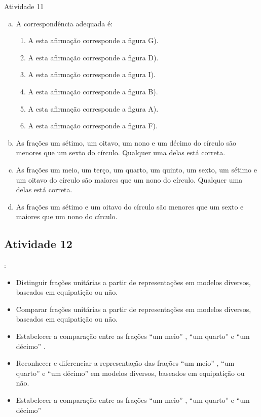 \begin{multicols}{2}
\begin{resposta*}{Atividade 11}
\begin{enumerate}[a),wide,labelindent=0pt] %
    \item       A correspondência adequada é:
\begin{enumerate} [\;\; I), labelindent=0pt] %
        \item           A esta afirmação corresponde a figura G).
        \item           A esta afirmação corresponde a figura D).
        \item           A esta afirmação corresponde a figura I).
        \item           A esta afirmação corresponde a figura B).
        \item           A esta afirmação corresponde a figura A).
        \item           A esta afirmação corresponde a figura F).
\end{enumerate} %

    \item       As frações um sétimo, um oitavo, um nono e um décimo do círculo são menores que um sexto do círculo. Qualquer uma delas está correta.
    \item       As frações um meio, um terço, um quarto, um quinto, um sexto, um sétimo e um oitavo do círculo são maiores que um nono do círculo. Qualquer uma delas está correta.
    \item       As frações um sétimo e um oitavo do círculo são menores que um sexto e maiores que um nono do círculo.
\end{enumerate} %
\end{resposta*}




\subsection{Atividade 12}

  : \vspace{.1cm}
  
\begin{itemize} %
    \item       Distinguir frações unitárias a partir de representações em modelos diversos, baseados em equipatição ou não.
    \item       Comparar frações unitárias a partir de representações em modelos diversos, baseados em equipatição ou não.
    \item       Estabelecer a comparação entre as frações       ``um meio''      ,       ``um quarto''       e       ``um décimo''      .
    \item       Reconhecer e diferenciar a representação das frações       ``um meio''      ,       ``um quarto''       e       ``um décimo''       em modelos diversos, baseados em equipatição ou não.
    \item       Estabelecer a comparação entre as frações       ``um meio''      ,       ``um quarto''       e       ``um décimo''
\end{itemize} %


\end{multicols}
